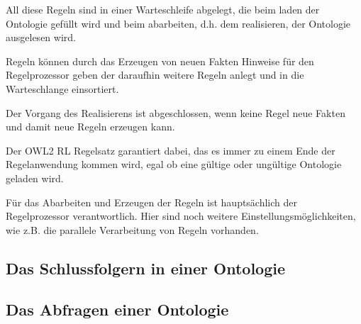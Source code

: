 All diese Regeln sind in einer Warteschleife abgelegt, die beim laden der Ontologie gefüllt wird und beim abarbeiten, d.h. dem realisieren, der Ontologie ausgelesen wird.

Regeln können durch das Erzeugen von neuen Fakten Hinweise für den Regelprozessor geben der daraufhin weitere Regeln anlegt und in die Warteschlange einsortiert.

Der Vorgang des Realisierens ist abgeschlossen, wenn keine Regel neue Fakten und damit neue Regeln erzeugen kann.

Der OWL2 RL Regelsatz garantiert dabei, das es immer zu einem Ende der Regelanwendung kommen wird, egal ob eine gültige oder ungültige Ontologie geladen wird.

Für das Abarbeiten und Erzeugen der Regeln ist hauptsächlich der Regelprozessor verantwortlich. Hier sind noch weitere Einstellungsmöglichkeiten, wie z.B. die parallele Verarbeitung von Regeln vorhanden.


\subsection{Das Schlussfolgern in einer Ontologie}

\subsection{Das Abfragen einer Ontologie}


